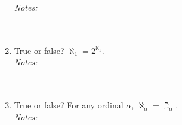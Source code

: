 \documentclass[justified]{tufte-handout}
\begin{document}
\begin{enumerate}[label=\roman*.]
\noindent \emph{Notes:}  \underline{\hspace{15.4cm}}\\\\\underline{\hspace{16.43cm}}\\

\item True or false? $\aleph_1=2^{\aleph_1}$.\\

\noindent \emph{Notes:}  \underline{\hspace{15.4cm}}\\\\\underline{\hspace{16.43cm}}\\

\item True or false? For any ordinal $\alpha$, $\aleph_\alpha=\beth_\alpha$.\\

\noindent \emph{Notes:}  \underline{\hspace{15.4cm}}\\\\\underline{\hspace{16.43cm}}\\

\end{enumerate}
\end{document}
